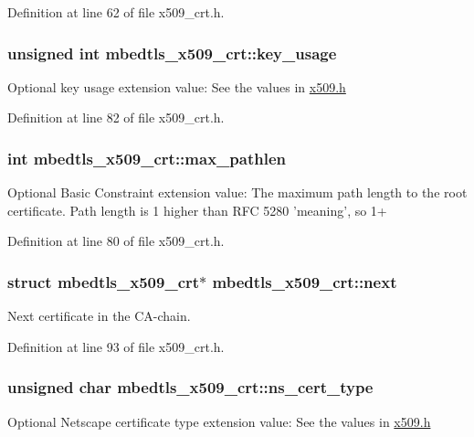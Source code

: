 Definition at line 62 of file x509\-\_\-crt.\-h.

\hypertarget{structmbedtls__x509__crt_a3b7650600aa6e637b8ab534a938aee94}{
\subsubsection[{key\-\_\-usage}]{\setlength{\rightskip}{0pt plus 5cm}unsigned int mbedtls\-\_\-x509\-\_\-crt\-::key\-\_\-usage}}\label{structmbedtls__x509__crt_a3b7650600aa6e637b8ab534a938aee94}
Optional key usage extension value\-: See the values in \hyperlink{x509_8h}{x509.\-h} 

Definition at line 82 of file x509\-\_\-crt.\-h.

\hypertarget{structmbedtls__x509__crt_ab0af43652f426ace28052ec47fdde6fb}{
\subsubsection[{max\-\_\-pathlen}]{\setlength{\rightskip}{0pt plus 5cm}int mbedtls\-\_\-x509\-\_\-crt\-::max\-\_\-pathlen}}\label{structmbedtls__x509__crt_ab0af43652f426ace28052ec47fdde6fb}
Optional Basic Constraint extension value\-: The maximum path length to the root certificate. Path length is 1 higher than R\-F\-C 5280 'meaning', so 1+ 

Definition at line 80 of file x509\-\_\-crt.\-h.

\hypertarget{structmbedtls__x509__crt_ac9dbc43b90ddd74fe55452495a304923}{
\subsubsection[{next}]{\setlength{\rightskip}{0pt plus 5cm}struct {\bf mbedtls\-\_\-x509\-\_\-crt}$\ast$ mbedtls\-\_\-x509\-\_\-crt\-::next}}\label{structmbedtls__x509__crt_ac9dbc43b90ddd74fe55452495a304923}
Next certificate in the C\-A-\/chain. 

Definition at line 93 of file x509\-\_\-crt.\-h.

\hypertarget{structmbedtls__x509__crt_adc36c60aa279fae8bd35a20b9c2bba22}{
\subsubsection[{ns\-\_\-cert\-\_\-type}]{\setlength{\rightskip}{0pt plus 5cm}unsigned char mbedtls\-\_\-x509\-\_\-crt\-::ns\-\_\-cert\-\_\-type}}\label{structmbedtls__x509__crt_adc36c60aa279fae8bd35a20b9c2bba22}
Optional Netscape certificate type extension value\-: See the values in \hyperlink{x509_8h}{x509.\-h} 

